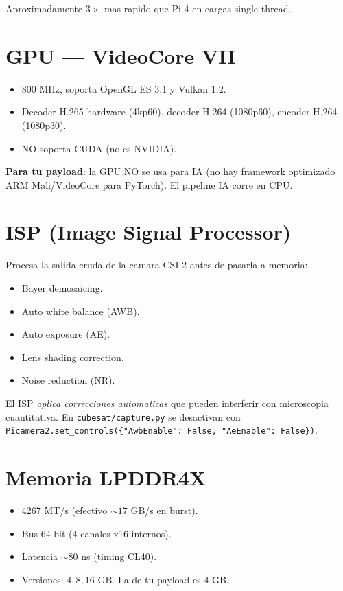 \documentclass[11pt,a4paper,oneside]{report}
\begin{document}
Aproximadamente $3\times$ mas rapido que Pi 4 en cargas single-thread.

\section{GPU --- VideoCore VII}

\begin{itemize}[leftmargin=2em]
  \item 800 MHz, soporta OpenGL ES 3.1 y Vulkan 1.2.
  \item Decoder H.265 hardware (4kp60), decoder H.264 (1080p60), encoder H.264 (1080p30).
  \item NO soporta CUDA (no es NVIDIA).
\end{itemize}

\textbf{Para tu payload}: la GPU NO se usa para IA (no hay framework optimizado
ARM Mali/VideoCore para PyTorch). El pipeline IA corre en CPU.

\section{ISP (Image Signal Processor)}

Procesa la salida cruda de la camara CSI-2 antes de pasarla a memoria:

\begin{itemize}[leftmargin=2em]
  \item Bayer demosaicing.
  \item Auto white balance (AWB).
  \item Auto exposure (AE).
  \item Lens shading correction.
  \item Noise reduction (NR).
\end{itemize}

\begin{cuidado}
El ISP \emph{aplica correcciones automaticas} que pueden interferir con
microscopia cuantitativa. En \texttt{cubesat/capture.py} se desactivan
con \texttt{Picamera2.set\_controls(\{"AwbEnable": False, "AeEnable": False\})}.
\end{cuidado}

\section{Memoria LPDDR4X}

\begin{itemize}[leftmargin=2em]
  \item 4267 MT/s (efectivo $\sim 17$ GB/s en burst).
  \item Bus 64 bit (4 canales x16 internos).
  \item Latencia $\sim 80$ ns (timing CL40).
  \item Versiones: $4, 8, 16$ GB. La de tu payload es $4$ GB.
\end{itemize}
\end{document}
